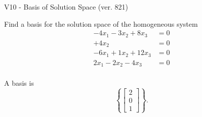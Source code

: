 \begin{exercise}
  \begin{exerciseTitle}V10 - Basis of Solution Space (ver. 821)\end{exerciseTitle}
  \begin{exerciseStatement}
    Find a basis for the solution space of the homogeneous system 
\begin{align*}
 -4 x_ 1 -3 x_ 2 + 8 x_ 3 &= 0  \\ 
  + 4 x_ 2 &= 0  \\ 
  -6 x_ 1 + 1 x_ 2 + 12 x_ 3 &= 0  \\ 
  2 x_ 1 -2 x_ 2 -4 x_ 3 &= 0  \\ 
 \end{align*}


 
  \end{exerciseStatement}

  \begin{exerciseAnswer}
   A basis is   
\[\left\{\left[\begin{array}{c}
2 \\
0 \\
1
\end{array}\right]\right\}.\]

  


  \end{exerciseAnswer}
\end{exercise}